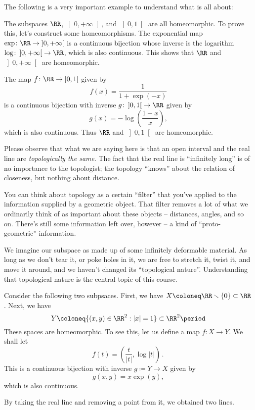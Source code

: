 The following is a very important example to understand what  is all about:
\begin{exm}
	The subspaces $\RR$, $\left]0,+\infty\right[$, and $\left]0,1\right[$ are all homeomorphic.
	To prove this, let's construct some homeomorphisms.
	The exponential map $\exp \colon \RR \to \left]0,+\infty\right[$ is a continuous bijection%
	whose inverse is the logarithm $\log \colon \left]0,+\infty\right[ \to \RR$, which is also continuous.
	This shows that $\RR$ and $\left]0,+\infty\right[$ are homeomorphic.

	The map $ f \colon \RR \to \left]0,1\right[ $ given by
	\[
		f(x) = \frac{1}{1+\exp(-x)}
	\]
	is a continuous bijection with inverse $ g\colon \left]0,1\right[ \to \RR $ given by
	\[
		g(x) = -\log\left(\frac{1-x}{x}\right) \comma
	\]
	which is also continuous.
	Thus $\RR$ and $\left]0,1\right[$ are homeomorphic.

	Please observe that what we are saying here is that an open interval and the real line are \emph{topologically the same}.
	The fact that the real line is \enquote{infinitely long} is of no importance to the topologist;
	the topology \enquote{knows} about the relation of closeness, but nothing about distance.
\end{exm}

You can think about topology as a certain \enquote{filter} that you've applied to the information supplied by a geometric object.
That filter removes a lot of what we ordinarily think of as important about these objects -- distances, angles, and so on.
There's still some information left over, however -- a kind of \enquote{proto-geometric} information.

We imagine our subspace as made up of some infinitely deformable material.
As long as we don't tear it, or poke holes in it, we are free to stretch it, twist it, and move it around, and we haven't changed its \enquote{topological nature}.
Understanding that topological nature is the central topic of this course.

\begin{exm}
	Consider the following two subpsaces.
	First, we have $X \coloneq \RR \smallsetminus \{0\} \subset \RR$.
	Next, we have
	\[
		Y \coloneq \{(x,y) \in \RR^2 : |x| = 1 \} \subset \RR^2 \period
	\]
	These spaces are homeomorphic.
	To see this, let us define a map $ f \colon X \to Y$.
	We shall let
	\[
		f(t) = \left(\frac{t}{|t|}, \log |t|\right) \period
	\]
	This is a continuous bijection with inverse $g \coloneq Y \to X $ given by
	\[
		g(x,y) = x\exp(y) \comma
	\]
	which is also continuous.

	By taking the real line and removing a point from it, we obtained two lines.%
\end{exm}

